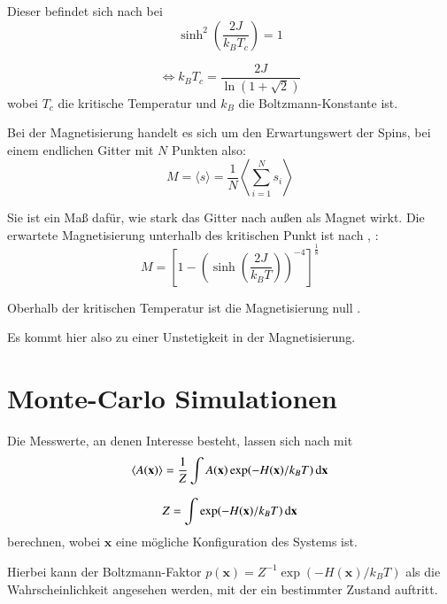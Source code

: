 \documentclass{scrreprt}
\begin{document}
	Dieser befindet sich nach \cite{OnsagerCrystal1} bei \[\sinh^2\left(\frac{2J}{k_BT_c}\right) =1\]
	
	\begin{equation}
	\Leftrightarrow k_BT_c=\frac{2J}{\ln(1+\sqrt{2})}
	\label{eq:kritischetemperatur}
	\end{equation}
	wobei $T_c$ die kritische Temperatur und $k_B$ die Boltzmann-Konstante ist.
	
	
	Bei der Magnetisierung handelt es sich um den Erwartungswert der Spins, bei einem endlichen Gitter mit $N$ Punkten also\cite[vgl. ][S. 8]{binderheermann}:
	\begin{equation}
	M=\langle s \rangle=\frac{1}{N}\left\langle  \sum_{i=1}^{N} s_i \right\rangle
	\label{eq:magnetisierung}
	\end{equation}

	
	Sie ist ein Maß dafür, wie stark das Gitter nach außen als Magnet wirkt. Die erwartete Magnetisierung unterhalb des kritischen Punkt ist nach \cite{YangMagnetization}, \cite{MontrollMagnetization}:
	\begin{equation} M=\left[1-\left(\sinh\left(\frac{2J}{k_BT}\right)\right)^{-4}\right]^{\frac{1}{8}}
	\label{eq:magnetisierungsgleichungliteratur}
	\end{equation}
	
	Oberhalb der kritischen Temperatur ist die Magnetisierung null \cite[Gl. 81]{MontrollMagnetization}.
	
	Es kommt hier also zu einer Unstetigkeit in der Magnetisierung.
	
	\section{Monte-Carlo Simulationen}
	\label{sec:mctheorie}
	Die Messwerte, an denen Interesse besteht, lassen sich nach \cite[S. 8]{binderheermann}  mit \[
	\langle A(\mathbf{x}) \rangle=\frac{1}{Z}\int A(\mathbf{x}) \exp(-H(\mathbf{x})/k_BT)\dif \mathbf{x}\]
	
	\[
	Z=\int \exp(-H(\mathbf{x})/k_BT) \dif \mathbf{x}
	\]
	berechnen, wobei $\mathbf{x}$ eine mögliche Konfiguration des Systems ist.
	
	
	Hierbei kann der Boltzmann-Faktor $p(\mathbf{x})=Z^{-1} \exp(-H(\mathbf{x})/k_BT)$ als die Wahrscheinlichkeit angesehen werden, mit der ein bestimmter Zustand auftritt\cite[vgl. ][S. 8 f.]{binderheermann}.
	
\end{document}
